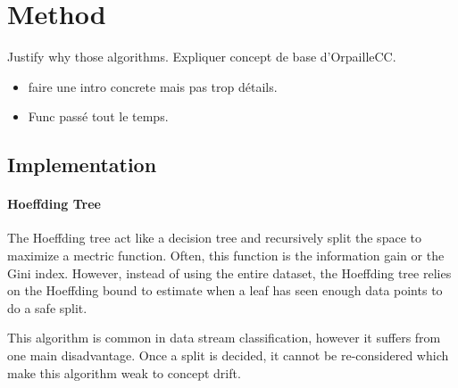 \section{Method}
Justify why those algorithms.
Expliquer concept de base d'OrpailleCC.
\begin{itemize}
	\item faire une intro concrete mais pas trop détails.
	\item Func passé tout le temps.
\end{itemize}

\subsection{Implementation}
\paragraph{Hoeffding Tree~\cite{VFDT}}
The Hoeffding tree act like a decision tree and recursively split the space to
maximize a mectric function. Often, this function is the information gain or
the Gini index. However, instead of using the entire dataset, the Hoeffding
tree relies on the Hoeffding bound to estimate when a leaf has seen enough data
points to do a safe split.

This algorithm is common in data stream classification, however it suffers from
one main disadvantage. Once a split is decided, it cannot be re-considered
which make this algorithm weak to concept drift.

